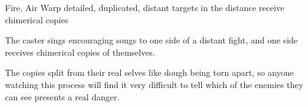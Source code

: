   {Fire, Air}%
  {Warp}%
  {detailed, duplicated, distant}%
  {}%
  { targets in the distance receive chimerical copies}%
  {
    The caster sings encouraging songs to one side of a distant fight, and one side receives chimerical copies of themselves.

    The copies split from their real selves like dough being torn apart, so anyone watching this process will find it very difficult to tell which of the enemies they can see presents a real danger.
  }

